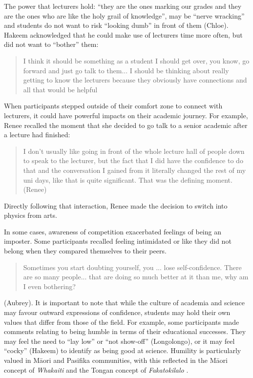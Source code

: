 The power that lecturers hold: ``they are the ones marking our grades and they are the ones who are like the holy grail of knowledge'', may be ``nerve wracking'' and students do not want to risk ``looking dumb'' in front of them (Chloe). Hakeem acknowledged that he could make use of lecturers time more often, but did not want to ``bother''  them: \blockquote{I think it should be something as a student I should get over, you know, go forward and just go talk to them... I should be thinking about really getting to know the lecturers because they obviously have connections and all that would be helpful}. When participants stepped outside of their comfort zone to connect with lecturers, it could have powerful impacts on their academic journey. For example, Renee recalled the moment that she decided to go talk to a senior academic after a lecture had finished: \blockquote{I don't usually like going in front of the whole lecture hall of people down to speak to the lecturer, but the fact that I did have the confidence to do that and the conversation I gained from it literally changed the rest of my uni days, like that is quite significant. That was the defining moment. (Renee)}  Directly following that interaction, Renee made the decision to switch into physics from arts.

In some cases, awareness of competition exacerbated feelings of being an imposter. Some participants recalled feeling intimidated or like they did not belong when they compared themselves to their peers. \blockquote{Sometimes you start doubting yourself, you ... lose self-confidence. There are so many people... that are doing so much better at it than me, why am I even bothering?} (Aubrey). It is important to note that while the culture of academia and science may favour outward expressions of confidence, students may hold their own values that differ from those of the field. For example, some participants made comments relating to being humble in terms of their educational successes. They may feel the need to ``lay low'' or ``not show-off'' (Longolongo), or it may feel ``cocky'' (Hakeem) to identify as being good at science. Humility is particularly valued in M\={a}ori and Pasifika communities, with this reflected in the M\={a}ori concept of \textit{Whakaiti} \cite{haar2018indigenous} and the Tongan concept of \textit{Fakatokilalo} \cite{mafile2004exploring}. 

